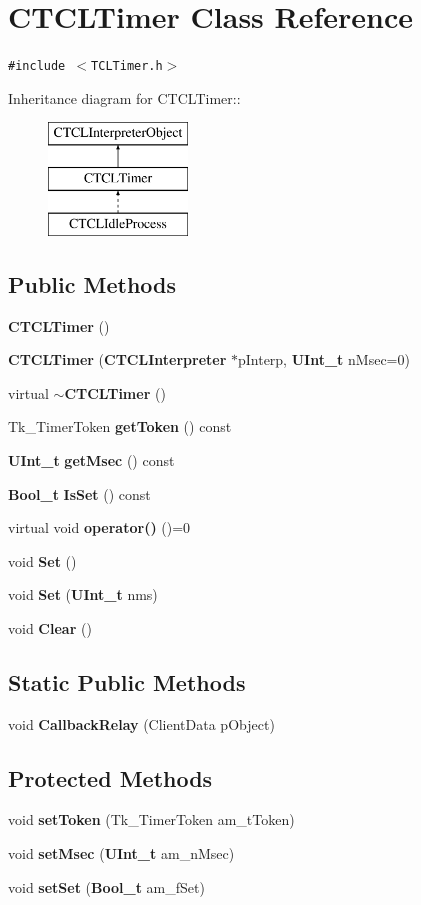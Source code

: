 \section{CTCLTimer  Class Reference}
\label{classCTCLTimer}
{\tt \#include $<$TCLTimer.h$>$}

Inheritance diagram for CTCLTimer::\begin{figure}[H]
\begin{center}
\leavevmode
\includegraphics[height=3cm]{classCTCLTimer}
\end{center}
\end{figure}
\subsection*{Public Methods}
\begin{CompactItemize}
\item 
{\bf CTCLTimer} ()
\item 
{\bf CTCLTimer} ({\bf CTCLInterpreter} $\ast$p\-Interp, {\bf UInt\_\-t} n\-Msec=0)
\item 
virtual {\bf $\sim$CTCLTimer} ()
\item 
Tk\_\-Timer\-Token {\bf get\-Token} () const
\item 
{\bf UInt\_\-t} {\bf get\-Msec} () const
\item 
{\bf Bool\_\-t} {\bf Is\-Set} () const
\item 
virtual void {\bf operator()} ()=0
\item 
void {\bf Set} ()
\item 
void {\bf Set} ({\bf UInt\_\-t} nms)
\item 
void {\bf Clear} ()
\end{CompactItemize}
\subsection*{Static Public Methods}
\begin{CompactItemize}
\item 
void {\bf Callback\-Relay} (Client\-Data p\-Object)
\end{CompactItemize}
\subsection*{Protected Methods}
\begin{CompactItemize}
\item 
void {\bf set\-Token} (Tk\_\-Timer\-Token am\_\-t\-Token)
\item 
void {\bf set\-Msec} ({\bf UInt\_\-t} am\_\-n\-Msec)
\item 
void {\bf set\-Set} ({\bf Bool\_\-t} am\_\-f\-Set)
\end{CompactItemize}
